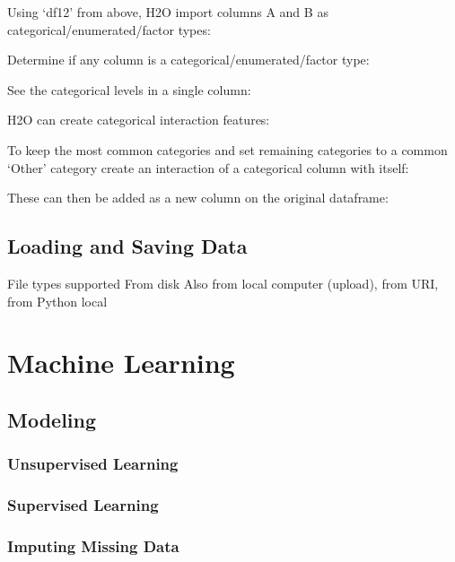 Using `df12' from above, H2O import columns A and B as categorical/enumerated/factor types:


Determine if any column is a categorical/enumerated/factor type:


See the categorical levels in a single column:


H2O can create categorical interaction features:


To keep the most common categories and set remaining categories to a common `Other' category
create an interaction of a categorical column with itself:


These can then be added as a new column on the original dataframe:


\subsection{Loading and Saving Data}
File types supported
From disk
Also from local computer (upload), from URI, from Python local


\section{Machine Learning}

\subsection{Modeling}
\subsubsection{Unsupervised Learning}
\subsubsection{Supervised Learning}
\subsubsection{Imputing Missing Data}

